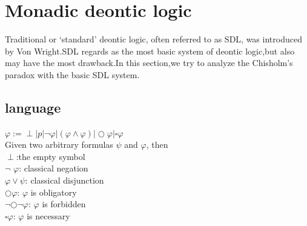 \documentclass{article}
\begin{document}
\section{Monadic deontic logic}
Traditional or ‘standard’ deontic logic, often referred to as SDL, was introduced by Von Wright\cite{4}.SDL regards as the most basic system of deontic logic,but also may have the most drawback.In this section,we try to analyze the Chisholm’s paradox with the basic SDL system.
\subsection{language}
$\varphi :=\perp | p |\neg \varphi |(\varphi \wedge \varphi)|\bigcirc\varphi|\square\varphi $\\
Given two arbitrary formulas $\psi$  and $\varphi$, then\\
$\perp$:the empty symbol\\
$\neg$ $\varphi$: classical negation\\
$\varphi \vee  \psi $: classical disjunction\\
$\bigcirc \varphi $: $\varphi$ is obligatory\\
$ \neg \bigcirc\neg\varphi$: $ \varphi$ is forbidden\\
$ \square\varphi$: $\varphi$ is necessary
\end{document}
